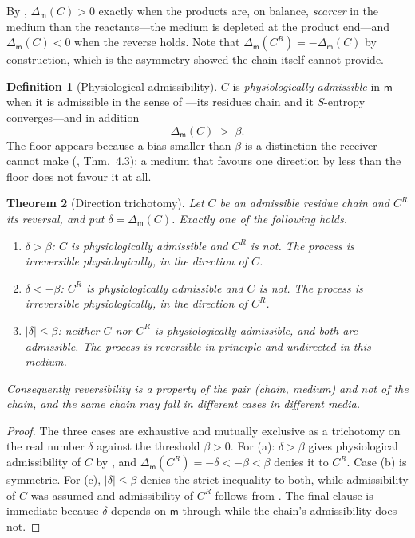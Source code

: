 \documentclass[11pt,twocolumn,a4paper]{article}
\theoremstyle{thmstyle}
\newtheorem{theorem}{Theorem}[section]
\theoremstyle{definition}
\newtheorem{definition}[theorem]{Definition}
\theoremstyle{remark}
\newcommand{\flo}{\beta}
\newcommand{\med}{\mathsf{m}}
\newcommand{\abs}[1]{\lvert#1\rvert}
\begin{document}
By , $\Delta_{\med}(C) > 0$ exactly when the
products are, on balance, \emph{scarcer} in the medium than the
reactants---the medium is depleted at the product end---and
$\Delta_{\med}(C) < 0$ when the reverse holds. Note that
$\Delta_{\med}(C^{R}) = -\Delta_{\med}(C)$ by construction, which is the
asymmetry  showed the chain itself cannot provide.

\begin{definition}[Physiological admissibility]
\label{def:phys-admissible}
$C$ is \emph{physiologically admissible} in $\med$ when it is admissible
in the sense of \citet{sachikonye2025causal}---its residues chain and it
$S$-entropy converges---and in addition
\[
\Delta_{\med}(C) \;>\; \flo .
\]
The floor appears because a bias smaller than $\flo$ is a distinction the
receiver cannot make (\citealt{sachikonye2026shakespeare}, Thm.~4.3): a
medium that favours one direction by less than the floor does not favour
it at all.
\end{definition}

\begin{theorem}[Direction trichotomy]
\label{thm:direction}
Let $C$ be an admissible residue chain and $C^{R}$ its reversal, and put
$\delta = \Delta_{\med}(C)$. Exactly one of the following holds.
\begin{enumerate}[label=(\alph*),leftmargin=1.8em,itemsep=2pt]
\item $\delta > \flo$: \; $C$ is physiologically admissible and $C^{R}$ is
not. The process is \emph{irreversible physiologically}, in the direction
of $C$.
\item $\delta < -\flo$: \; $C^{R}$ is physiologically admissible and $C$
is not. The process is irreversible physiologically, in the direction of
$C^{R}$.
\item $\abs{\delta} \le \flo$: \; neither $C$ nor $C^{R}$ is
physiologically admissible, and both are admissible. The process is
\emph{reversible in principle and undirected in this medium}.
\end{enumerate}
Consequently reversibility is a property of the pair (chain, medium) and
not of the chain, and the same chain may fall in different cases in
different media.
\end{theorem}

\begin{proof}
The three cases are exhaustive and mutually exclusive as a trichotomy on
the real number $\delta$ against the threshold $\flo>0$. For (a):
$\delta>\flo$ gives physiological admissibility of $C$ by
, and $\Delta_{\med}(C^{R})=-\delta<-\flo<\flo$
denies it to $C^{R}$. Case (b) is symmetric. For (c), $\abs{\delta}\le\flo$
denies the strict inequality to both, while admissibility of $C$ was
assumed and admissibility of $C^{R}$ follows from
. The final clause is immediate because
$\delta$ depends on $\med$ through  while the chain's
admissibility does not.
\end{proof}
\end{document}
